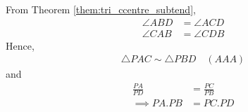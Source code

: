 \begin{enumerate}[label=\arabic*.,ref=\thesubsection.\theenumi]
%
\solution From Theorem \ref{them:tri_ccentre_subtend}, 
	\begin{equation}
	\begin{split}
\angle ABD &= \angle ACD \\
\angle CAB &= \angle CDB	
	\end{split}
	\end{equation}
Hence, 
%
\begin{align}
\triangle PAC \sim \triangle  PBD \quad (AAA)
\end{align}
%
and
%
\begin{align}
\frac{PA}{PD} &= \frac{PC}{PB} \\
\implies PA.PB &= PC.PD
\end{align}
%
%
%		
%

\end{enumerate}
